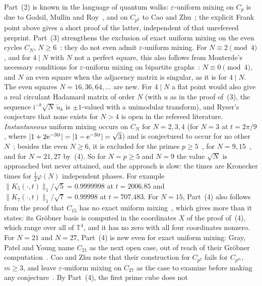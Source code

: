 \begin{remark}\label{rem:bn-saturation}
Part~(2) is known in the language of quantum walks: $\varepsilon$-uniform mixing on $C_p$ is due to Godsil,
Mullin and Roy~\cite{GMR17}, and on $C_{p^2}$ to Cao and Zhu~\cite[Thm.~5.4]{CaoZhu26}; the explicit Frank point above
gives a short proof of the latter, independent of that unrefereed preprint. Part~(3) strengthens the exclusion of exact uniform mixing on the even cycles
$C_N$, $N\ge6$~\cite{GMR17}: they do not even admit $\varepsilon$-uniform mixing. For $N\equiv2\pmod4$, and for
$4\mid N$ with $N$ not a perfect square, this also follows from Monterde's necessary conditions for
$\varepsilon$-uniform mixing on bipartite graphs~\cite[Thm.~9]{Monterde}: $N\equiv0\pmod4$, and $N$ an even square
when the adjacency matrix is singular, as it is for $4\mid N$. The even squares $N=16,36,64,\dots$ are new. For
$4\mid N$ a flat point would also give a real circulant Hadamard matrix of order $N$ (with $u$ as in the proof
of~(3), the sequence $\mathrm i^{-k}\sqrt N\,\check u_k$ is $\pm1$-valued with a unimodular transform), and Ryser's conjecture that none
exists for $N>4$ is open in the refereed literature.
\emph{Instantaneous} uniform mixing
occurs on $C_N$ for $N=2,3,4$ (for $N=3$ at $t=2\pi/9$, where $|1+2\mathrm{e}^{-3\mathrm it}|=|1-\mathrm{e}^{-3\mathrm it}|=\sqrt3$)
and is conjectured to occur for no other $N$~\cite{ABTW}; besides the even $N\ge6$,
it is excluded for the primes $p\ge5$~\cite{GMR17}, for $N=9,15$~\cite{CaoZhu26,GPY}, and for $N=21,27$ by~(4). So for $N=p\ge5$ and $N=9$
the value $\sqrt N$ is approached but never attained, and the approach is slow: the times are Kronecker times
for $\tfrac12\varphi(N)$ independent phases. For example $\|K_5(\cdot,t)\|_1/\sqrt5=0.9999998$ at $t=2006.85$ and
$\|K_7(\cdot,t)\|_1/\sqrt7=0.99998$ at $t=707.483$. For $N=15$, Part~(4) also follows from the proof that $C_{15}$ has no exact uniform
mixing~\cite[Thm.~3.2]{CaoZhu26}, which gives more than it states: its Gr\"obner basis is computed in the
coordinates $X$ of the proof of~(4), which range over all of $\mathbb T^4$, and it has no zero with all four
coordinates nonzero. For $N=21$ and $N=27$, Part~(4) is new even for exact uniform mixing: Gray, Patel and Young
name $C_{21}$ as the next open case, out of reach of their Gr\"obner computation~\cite{GPY}. Cao and Zhu note that
their construction for $C_{p^2}$ fails for $C_{p^m}$, $m\ge3$, and leave $\varepsilon$-uniform mixing on $C_{27}$
as the case to examine before making any conjecture~\cite[\S6]{CaoZhu26}. By Part~(4), the first prime cube does not

\end{remark}
